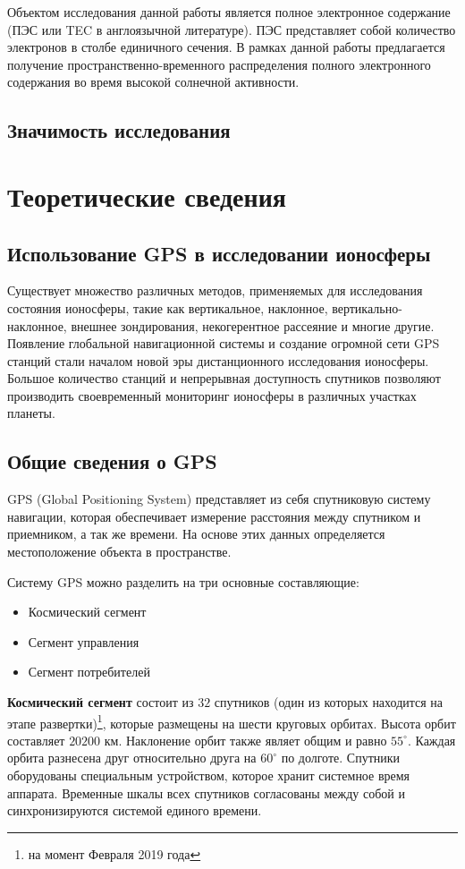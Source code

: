 \documentclass[14pt,eqno, fontsize=14pt]{article}
\begin{document}
Объектом исследования данной работы является полное электронное содержание (ПЭС или TEC в англоязычной литературе). ПЭС представляет собой количество электронов в столбе единичного сечения. В рамках данной работы предлагается получение пространственно-временного распределения полного электронного содержания во время высокой солнечной активности.

\subsection*{Значимость исследования}


\newpage
\section{Теоретические сведения}
\subsection{Использование GPS в исследовании ионосферы}
Существует множество различных методов, применяемых для исследования состояния ионосферы, такие как вертикальное, наклонное, вертикально-наклонное, внешнее зондирования, некогерентное рассеяние и многие другие. Появление глобальной навигационной системы и создание огромной сети GPS станций стали началом новой эры дистанционного исследования ионосферы. Большое количество станций и непрерывная доступность спутников позволяют производить своевременный мониторинг ионосферы в различных участках планеты. 

\subsection{Общие сведения о GPS}
GPS (Global Positioning System) представляет из себя спутниковую систему навигации, которая обеспечивает измерение расстояния между спутником и приемником, а так же времени. На основе этих данных определяется местоположение объекта в пространстве.

Систему GPS можно разделить на три основные составляющие:
\begin{itemize}
\item Космический сегмент
\item Сегмент управления
\item Сегмент потребителей
\end{itemize}

\textbf{Космический сегмент} состоит из $32$ спутников (один из которых находится на этапе развертки)\footnote{на момент Февраля 2019 года}, которые размещены на шести круговых орбитах. Высота орбит составляет $20200$ км. Наклонение орбит также являет общим и равно $55^{\circ}$. Каждая орбита разнесена друг относительно друга на $60^{\circ}$ по долготе. Спутники оборудованы специальным устройством, которое хранит системное время аппарата. Временные шкалы всех спутников согласованы между собой и синхронизируются системой единого времени.
\end{document}
